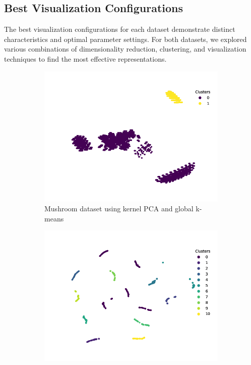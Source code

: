 \subsection{Best Visualization Configurations}
\label{subsec:best-visualization-configs}

The best visualization configurations for each dataset demonstrate distinct characteristics and optimal parameter settings. For both datasets, we explored various combinations of dimensionality reduction, clustering, and visualization techniques to find the most effective representations.

\begin{figure}[h!]
    \centering
    \begin{subfigure}[b]{0.45\textwidth}
        \centering
        \includegraphics[width=\textwidth]{figures/visualizations/pca_n_components=3,kernel=rbf,gamma=0.1,n_clusters=2,max_iterations=100,tolerance=0.001,random_state=4.png}
        \caption{Mushroom dataset using kernel PCA and global k-means}
        \label{subfig:best_mushroom_viz}
    \end{subfigure}
    \hfill
    \begin{subfigure}[b]{0.45\textwidth}
        \centering
        \includegraphics[width=\textwidth]{figures/visualizations/umap_n_components=11,kernel=rbf,gamma=1,n_clusters=11,max_iterations=100,tolerance=0.0001,random_state=4.png}

\end{subfigure}
\end{figure}
